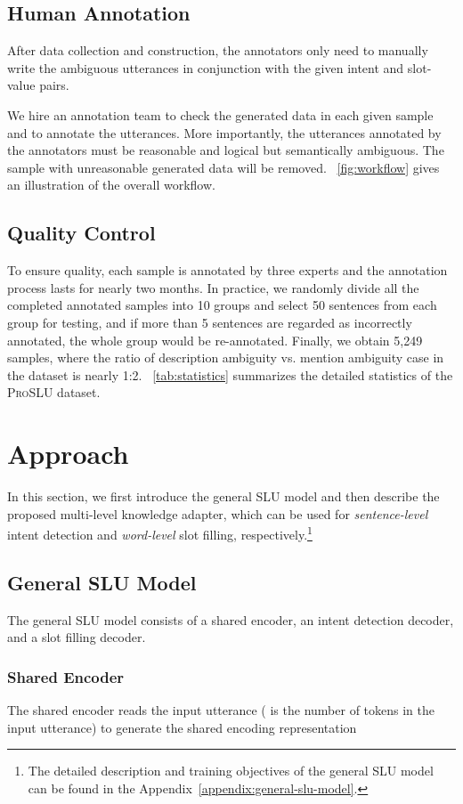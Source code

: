 \documentclass[letterpaper]{article} \usepackage{aaai22}  \usepackage{times}  \usepackage{helvet}  \usepackage{courier}  \usepackage[hyphens]{url}  \usepackage{graphicx} \urlstyle{rm} \def\UrlFont{\rm}  \usepackage{natbib}  \usepackage{caption} \DeclareCaptionStyle{ruled}{labelfont=normalfont,labelsep=colon,strut=off} \frenchspacing  \setlength{\pdfpagewidth}{8.5in}  \setlength{\pdfpageheight}{11in}  \usepackage{algorithm}
\begin{document}
\subsection{Human Annotation}

After data collection and construction, 
the annotators only need to manually write the ambiguous utterances in conjunction with the given intent and slot-value pairs. 

We hire an annotation team to check the generated data in each given sample and to annotate the utterances.
More importantly, the utterances annotated by the annotators must be reasonable and logical but semantically ambiguous.
The sample with unreasonable generated data will be removed. 
\figurename~\ref{fig:workflow} gives an illustration of the overall workflow.

\subsection{Quality Control}
To ensure quality, each sample is annotated by three experts and the annotation process lasts for nearly two months. 
In practice, we randomly divide all the completed annotated samples into 10 groups and select 50 sentences from each group for testing, and if more than 5 sentences are regarded as incorrectly annotated, the whole group would be re-annotated. 
Finally, we obtain 5,249 samples, where the ratio of description ambiguity vs. mention ambiguity case in the dataset is nearly 1:2. 
\tablename~\ref{tab:statistics} summarizes the detailed statistics of the \textsc{ProSLU} dataset. \section{Approach}
\label{Approach}
In this section, we first introduce the general SLU model and then describe the proposed multi-level knowledge adapter, which can be used for \textit{sentence-level} intent detection and \textit{word-level} slot filling, respectively.\footnote{The detailed description and training objectives of the general SLU model can be found in the Appendix~\ref{appendix:general-slu-model}.}

\subsection{General SLU Model} \label{sec:general_model}
The general SLU model consists of a shared encoder, an intent detection decoder, and a slot filling decoder.
\subsubsection{Shared Encoder}
The shared encoder reads the input utterance  ( is the number of tokens in the input utterance) to generate the shared encoding representation 
\end{document}
